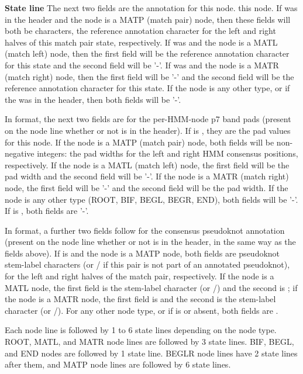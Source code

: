 \begin{sreitems}{\textbf{State line}}
  The next two fields are the  annotation for this node.
  this node. If  was  in the header and the node is
  a MATP (match pair) node, then these fields will both be characters,
  the reference annotation character for the left and right halves of
  this match pair state, respectively. If  was  and
  the node is a MATL (match left) node, then the first field will be
  the reference annotation character for this state and the second field
  will be '-'. If  was  and the node is a MATR
  (match right) node, then the first field will be '-' and the second
  field will be the reference annotation character for this state. If
  the node is any other type, or if the  was  in
  the header, then both fields will be '-'.

  In  format, the next two fields are for the
  per-HMM-node p7 band pads (present on the node line whether or not
   is  in the header). If 
  is , they are the pad values for this node. If the node is a MATP (match pair) node, both fields
  will be non-negative integers: the pad widths for the left and right
  HMM consensus positions, respectively. If the node is a MATL (match
  left) node, the first field will be the pad width and the second
  field will be '-'. If the node is a MATR (match right) node, the
  first field will be '-' and the second field will be the pad width.
  If the node is any other type (ROOT, BIF, BEGL, BEGR, END), both
  fields will be '-'. If  is , both fields
  are '-'.

  In  format, a further two fields follow
  for the  consensus pseudoknot annotation (present on the
  node line whether or not  is  in the header, in
  the same way as the  fields above). If  is
   and the node is a MATP node, both fields are pseudoknot
  stem-label characters (or /\prog{-} if this pair is not part
  of an annotated pseudoknot), for the left and right halves of the
  match pair, respectively. If the node is a MATL node, the first
  field is the stem-label character (or /\prog{-}) and the
  second is \prog{-}; if the node is a MATR node, the first field is
  \prog{-} and the second is the stem-label character (or
  /\prog{-}). For any other node type, or if  is
   or absent, both fields are \prog{-}.

  Each node line is followed by 1 to 6 state
  lines depending on the node type. ROOT, MATL, and MATR node lines
  are followed by 3 state lines. BIF, BEGL, and END nodes are followed
  by 1 state line. BEGLR node lines have 2 state lines after them, and
  MATP node lines are followed by 6 state lines. 


\end{sreitems}
